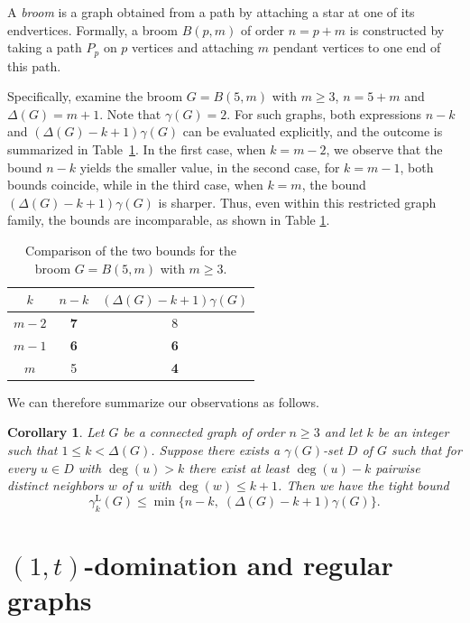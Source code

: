 \documentclass[11pt]{article}
\newtheorem{corollary}[theorem]{Corollary}
\newcommand{\gammakL}{\gamma_k^{\mathrm L}}
\begin{document}
A \textit{broom} is a graph obtained from a path by attaching a star at one of its endvertices. Formally, a broom $B(p,m)$ of order $n=p+m$ is constructed by taking a path $P_p$ on $p$ vertices and attaching $m$ pendant vertices to one end of this path.

Specifically, examine the broom $G=B(5,m)$ with $m\geq 3$, $n = 5+m$ and $\Delta(G) = m+1$.  
Note that $\gamma(G) = 2$.  For such graphs, both expressions $n-k$ and $(\Delta(G)-k+1)\gamma(G)$ can be evaluated explicitly, and the outcome is summarized in Table~\ref{table:broom}. In the first case, when $k=m-2$, we observe that the bound $n-k$ yields the smaller value, in the second case, for $k=m-1$, both bounds coincide, while in the third case, when $k=m$, the bound $(\Delta(G)-k+1)\gamma(G)$ is sharper. Thus, even within this restricted graph family, the bounds are incomparable, as shown in Table \ref{table:broom}.

\begin{table}[H]
\centering
\begin{tabular}{|c|c|c|}
\hline
$k$ & $n-k$ & $(\Delta(G)-k+1)\gamma(G)$ \\ \hline
$m-2$ & \textbf{7} & 8 \\ \hline
$m-1$ & \textbf{6}  & \textbf{6}\\ \hline
$m$ & 5 & \textbf{4} \\ \hline
\end{tabular}
\caption{Comparison of the two bounds for the broom $G=B(5,m)$ with $m \geq 3$.}
\label{table:broom}
\end{table}

We can therefore summarize our observations as follows.

\begin{corollary}
Let $G$ be a connected graph of order $n\geq 3$ and let $k$ be an integer such that $1 \le k < \Delta(G)$. 
Suppose there exists a $\gamma(G)$-set $D$ of $G$ such that for every $u\in D$ with $\deg(u)>k$
there exist at least $\deg(u)-k$ pairwise distinct neighbors $w$ of $u$ with $\deg(w)\le k+1$. Then we have the tight bound $$\gammakL(G) \leq \min\{n-k,\;(\Delta(G)-k+1)\gamma (G)\}.$$
\end{corollary}

\medskip

\section{$(1,t)$-domination and regular graphs}
\end{document}
